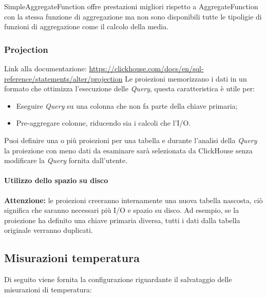 SimpleAggregateFunction offre prestazioni migliori rispetto a AggregateFunction con la stessa funzione di aggregazione ma non sono disponibili tutte le tipoligie di funzioni di aggregazione come il calcolo della media.


    
\subsubsection{Projection}\label{sec:projections}
Link alla documentazione: \href{https://clickhouse.com/docs/en/sql-reference/statements/alter/projection}{https://clickhouse.com/docs/en/sql-reference/statements/alter/projection}\newline
Le proiezioni memorizzano i dati in un formato che ottimizza l'esecuzione delle \textit{Query}, questa caratteristica è utile per:

\begin{itemize}
    \item Eseguire \textit{Query} su una colonna che non fa parte della chiave primaria;
    \item Pre-aggregare colonne, riducendo sia i calcoli che l'I/O.
\end{itemize}

Puoi definire una o più proiezioni per una tabella e durante l'analisi della \textit{Query} la proiezione con meno dati da esaminare sarà selezionata da ClickHouse senza modificare la \textit{Query} fornita dall'utente.

\paragraph*{Utilizzo dello spazio su disco}
\textbf{Attenzione:} le proiezioni creeranno internamente una nuova tabella nascosta, ciò significa che saranno necessari più I/O e spazio su disco. Ad esempio, se la proiezione ha definito una chiave primaria diversa, tutti i dati dalla tabella originale verranno duplicati.

\subsection{Misurazioni temperatura}
Di seguito viene fornita la configurazione riguardante il salvataggio delle misurazioni di temperatura:
